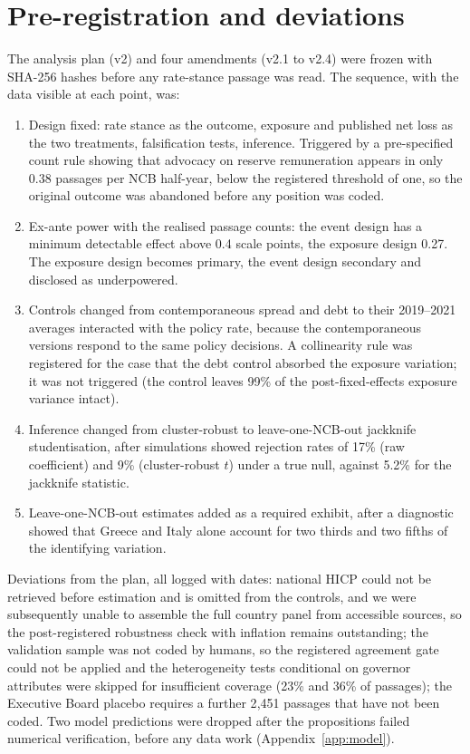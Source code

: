 \documentclass[11pt]{article}
\theoremstyle{plain}
\begin{document}
\section{Pre-registration and deviations}\label{app:prereg}
The analysis plan (v2) and four amendments (v2.1 to v2.4) were frozen with SHA-256 hashes before any rate-stance passage was read. The sequence, with the data visible at each point, was:
\begin{enumerate}\itemsep2pt
\item[v2] Design fixed: rate stance as the outcome, exposure and published net loss as the two treatments, falsification tests, inference. Triggered by a pre-specified count rule showing that advocacy on reserve remuneration appears in only 0.38 passages per NCB half-year, below the registered threshold of one, so the original outcome was abandoned before any position was coded.
\item[v2.1] Ex-ante power with the realised passage counts: the event design has a minimum detectable effect above 0.4 scale points, the exposure design 0.27. The exposure design becomes primary, the event design secondary and disclosed as underpowered.
\item[v2.2] Controls changed from contemporaneous spread and debt to their 2019--2021 averages interacted with the policy rate, because the contemporaneous versions respond to the same policy decisions. A collinearity rule was registered for the case that the debt control absorbed the exposure variation; it was not triggered (the control leaves 99\% of the post-fixed-effects exposure variance intact).
\item[v2.3] Inference changed from cluster-robust to leave-one-NCB-out jackknife studentisation, after simulations showed rejection rates of 17\% (raw coefficient) and 9\% (cluster-robust $t$) under a true null, against 5.2\% for the jackknife statistic.
\item[v2.4] Leave-one-NCB-out estimates added as a required exhibit, after a diagnostic showed that Greece and Italy alone account for two thirds and two fifths of the identifying variation.
\end{enumerate}

Deviations from the plan, all logged with dates: national HICP could not be retrieved before estimation and is omitted from the controls, and we were subsequently unable to assemble the full country panel from accessible sources, so the post-registered robustness check with inflation remains outstanding; the validation sample was not coded by humans, so the registered agreement gate could not be applied and the heterogeneity tests conditional on governor attributes were skipped for insufficient coverage (23\% and 36\% of passages); the Executive Board placebo requires a further 2{,}451 passages that have not been coded. Two model predictions were dropped after the propositions failed numerical verification, before any data work (Appendix~\ref{app:model}).
\end{document}
